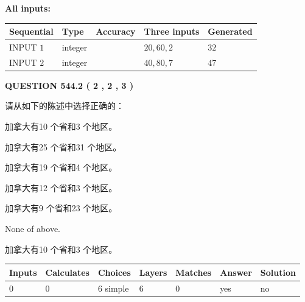 \documentclass{ctexart}
\begin{document}
   
   
   
\noindent\vspace{0.1in}\hspace{-0.08in} {\textbf{\Large{All inputs: }}}
   
   
  
  
\noindent\begin{tabular}{|l|l|l|l|l|}
\hline
 Sequential & Type & Accuracy & Three inputs & Generated \\ 
\hline
 
 
  INPUT $  1 $ & integer &  & $
 20
 , 
 60
 , 
 2
 $ & $ 32 $ 
 \\  \hline  
 
 
  INPUT $  2 $ & integer &  & $
 40
 , 
 80
 , 
 7
 $ & $ 47 $ 
 \\  \hline  
 \end{tabular}
   
   
  
\vspace{0.2in}
  
{\textbf{\Large{QUESTION
544.2 
 ( 2 , 2 , 3 )
}}}
  
  
请从如下的陈述中选择正确的：
 
 
加拿大有10 个省和3 个地区。
 
 
加拿大有25 个省和31 个地区。
 
 
加拿大有19 个省和4 个地区。
 
 
加拿大有12 个省和3 个地区。
 
 
加拿大有9 个省和23 个地区。
 
 
 None of above.
 
 
\noindent{}
 
 
加拿大有10 个省和3 个地区。
 
 
\noindent{}
 
 
   
   
   
   
\noindent\begin{tabular}{|l|l|l|l|l|l|l|}
 \hline
Inputs & Calculates & Choices & Layers & Matches & Answer & Solution \\ \hline
 0  & 
 0  & 
 6
  simple  
  & 
 6  & 
 0  & 
  yes & 
  no 
  \\ \hline
 \end{tabular}
   
\end{document}
